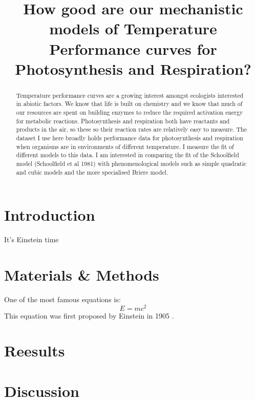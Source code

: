 \documentclass[12pt]{article}
\title{How good are our mechanistic models of Temperature Performance curves for Photosynthesis and Respiration?}
\date{}
\begin{document}
  \maketitle

  \begin{abstract}
    Temperature performance curves are a growing interest amongst ecologists interested in abiotic factors. We know that life is built on chemistry and we know that
    much of our resources are spent on building enzymes to reduce the required activation energy for metabolic reactions. Photosynthesis and respiration both have reactants and products in the air, so these
    so their reaction rates are relatively easy to measure. The dataset I use here broadly holds performance data for photosynthesis and respiration when organisms are in environments of different temperature. 
    I measure the fit of different models to this data. I am interested in comparing the fit of the Schoolfield model (Schoolfield et al 1981) with phenomenological models such as simple quadratic and cubic models
    and the more specialised Briere model. 

  \end{abstract}

  \section{Introduction}
    It's Einstein time

  \section{Materials \& Methods}
  One of the most famous equations is:
  \begin{equation}
  E = mc^2
  \end{equation}
  This equation was first proposed by Einstein in 1905
  \cite{einstein1905does}.

  \section{Reesults}
  \section{Discussion}
  
  
  
\end{document}
